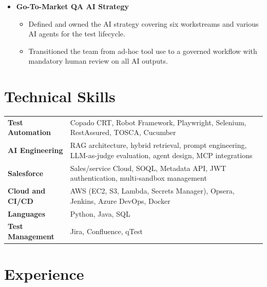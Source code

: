 \documentclass[11pt, a4paper]{article}
\begin{document}
\begin{itemize}
    \begin{itemize}
        \item Built a metadata-grounded agent drawing constraints from the Salesforce metadata API.
        \item Removed data setup bottlenecks without requiring write access to live systems.
    \end{itemize}
    \item \textbf{Go-To-Market QA AI Strategy}
    \begin{itemize}
        \item Defined and owned the AI strategy covering six workstreams and various AI agents for the test lifecycle.
        \item Transitioned the team from ad-hoc tool use to a governed workflow with mandatory human review on all AI outputs.
    \end{itemize}
\end{itemize}

\section{Technical Skills}

\begin{tabular}{@{} l p{13.5cm} @{}}
\textbf{Test Automation}     & Copado CRT, Robot Framework, Playwright, Selenium, RestAssured, TOSCA, Cucumber \\[2pt]
\textbf{AI Engineering}      & RAG architecture, hybrid retrieval, prompt engineering, LLM-as-judge evaluation, agent design, MCP integrations \\[2pt]
\textbf{Salesforce}          & Sales/service Cloud, SOQL, Metadata API, JWT authentication, multi-sandbox management \\[2pt]
\textbf{Cloud and CI/CD}     & AWS (EC2, S3, Lambda, Secrets Manager), Opsera, Jenkins, Azure DevOps, Docker \\[2pt]
\textbf{Languages}           & Python, Java, SQL \\[2pt]
\textbf{Test Management}     & Jira, Confluence, qTest \\
\end{tabular}

\section{Experience}
\end{document}
